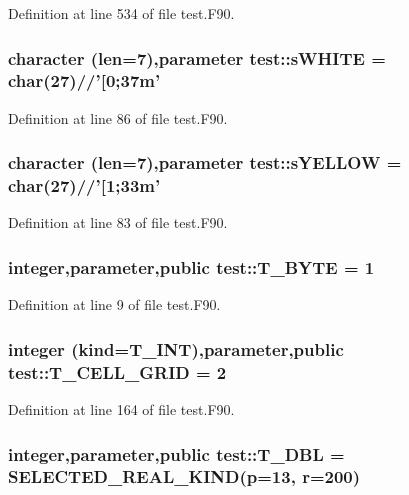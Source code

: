 Definition at line 534 of file test.F90.

\hypertarget{namespacetest_adda4462ac95858ee3e499e1f721f4cb9}{
\subsubsection[{sWHITE}]{\setlength{\rightskip}{0pt plus 5cm}character (len=7),parameter {\bf test::sWHITE} = char(27)//'\mbox{[}0;37m'}}
\label{namespacetest_adda4462ac95858ee3e499e1f721f4cb9}


Definition at line 86 of file test.F90.

\hypertarget{namespacetest_ae3efae673a64050b6961fb4a43eafe2f}{
\subsubsection[{sYELLOW}]{\setlength{\rightskip}{0pt plus 5cm}character (len=7),parameter {\bf test::sYELLOW} = char(27)//'\mbox{[}1;33m'}}
\label{namespacetest_ae3efae673a64050b6961fb4a43eafe2f}


Definition at line 83 of file test.F90.

\hypertarget{namespacetest_a3023425eff6a423b04bc28123a79fda5}{
\subsubsection[{T\_\-BYTE}]{\setlength{\rightskip}{0pt plus 5cm}integer,parameter,public {\bf test::T\_\-BYTE} = 1}}
\label{namespacetest_a3023425eff6a423b04bc28123a79fda5}


Definition at line 9 of file test.F90.

\hypertarget{namespacetest_afdd43703b42a2585fd3e53240e541b80}{
\subsubsection[{T\_\-CELL\_\-GRID}]{\setlength{\rightskip}{0pt plus 5cm}integer (kind={\bf T\_\-INT}),parameter,public {\bf test::T\_\-CELL\_\-GRID} = 2}}
\label{namespacetest_afdd43703b42a2585fd3e53240e541b80}


Definition at line 164 of file test.F90.

\hypertarget{namespacetest_af379b935264d350d76bf75331181e241}{
\subsubsection[{T\_\-DBL}]{\setlength{\rightskip}{0pt plus 5cm}integer,parameter,public {\bf test::T\_\-DBL} = SELECTED\_\-REAL\_\-KIND(p=13, r=200)}}
\label{namespacetest_af379b935264d350d76bf75331181e241}


